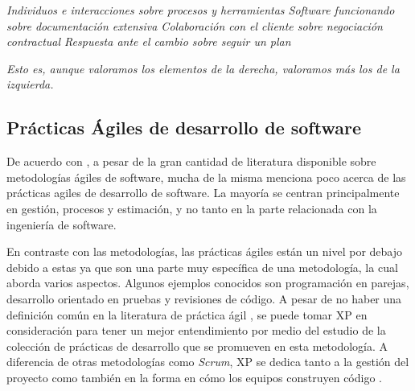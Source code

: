 \begin{center}
\emph{Individuos e interacciones sobre procesos y herramientas
Software funcionando sobre documentación extensiva
Colaboración con el cliente sobre negociación contractual
Respuesta ante el cambio sobre seguir un plan}
\end{center}

\emph{Esto es, aunque valoramos los elementos de la derecha,
valoramos más los de la izquierda.}

\subsection{Prácticas Ágiles de desarrollo de software} \label{sec:practicas-agiles-desarrollo}
De acuerdo con \cite{ford}, a pesar de la gran cantidad de literatura disponible sobre metodologías ágiles de software, mucha de la misma menciona poco acerca de las prácticas agiles de desarrollo de software. La mayoría se centran principalmente en gestión, procesos y estimación, y no tanto en la parte relacionada con la ingeniería de software.

En contraste con las metodologías, las prácticas ágiles están un nivel por debajo debido a estas ya que son una parte muy específica de una metodología, la cual aborda varios aspectos. Algunos ejemplos conocidos son programación en parejas, desarrollo orientado en pruebas y revisiones de código. A pesar de no haber una definición común en la literatura de práctica ágil \cite{diebold-dahlem}, se puede tomar XP en consideración para tener un mejor entendimiento por medio del estudio de la colección de prácticas de desarrollo que se promueven en esta metodología. A diferencia de otras metodologías como \emph{Scrum}, XP se dedica tanto a la gestión del proyecto como también en la forma en cómo los equipos construyen código \cite{shore-warden}.


